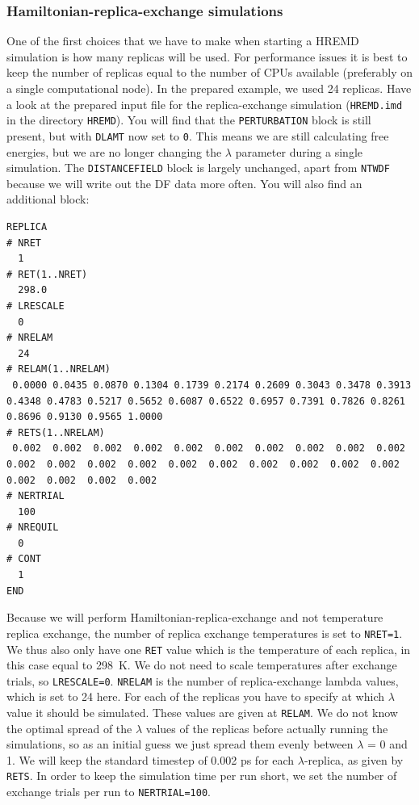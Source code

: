 \subsubsection{Hamiltonian-replica-exchange simulations}
One of the first choices that we have to make when starting a HREMD simulation is how many replicas will be used. 
For performance issues it is best to keep the number of replicas equal to the number of CPUs available (preferably on a single computational node). 
In the prepared example, we used 24 replicas. Have a look at the prepared input file for the replica-exchange simulation (\texttt{HREMD.imd} in the directory \texttt{HREMD}). 
You will find that the \texttt{PERTURBATION} block is still present, but with \texttt{DLAMT} now set to \texttt{0}. 
This means we are still calculating free energies, but we are no longer changing the $\lambda$ parameter during a single simulation. 
The \texttt{DISTANCEFIELD} block is largely unchanged, apart from \texttt{NTWDF} because we will write out the DF data more often. You will also find an additional block:
\begin{lstlisting}
REPLICA
# NRET
  1
# RET(1..NRET)
  298.0
# LRESCALE
  0
# NRELAM
  24
# RELAM(1..NRELAM)
 0.0000 0.0435 0.0870 0.1304 0.1739 0.2174 0.2609 0.3043 0.3478 0.3913 0.4348 0.4783 0.5217 0.5652 0.6087 0.6522 0.6957 0.7391 0.7826 0.8261 0.8696 0.9130 0.9565 1.0000
# RETS(1..NRELAM)
 0.002  0.002  0.002  0.002  0.002  0.002  0.002  0.002  0.002  0.002  0.002  0.002  0.002  0.002  0.002  0.002  0.002  0.002  0.002  0.002  0.002  0.002  0.002  0.002
# NERTRIAL
  100
# NREQUIL
  0
# CONT
  1
END
\end{lstlisting}
Because we will perform Hamiltonian-replica-exchange and not temperature replica exchange, the number of replica exchange temperatures is set to \texttt{NRET=1}. 
We thus also only have one \texttt{RET} value which is the temperature of each replica, in this case equal to 298~K. 
We do not need to scale temperatures after exchange trials, so \texttt{LRESCALE=0}. \texttt{NRELAM} is the number of replica-exchange lambda values, which is set to 24 here. 
For each of the replicas you have to specify at which $\lambda$ value it should be simulated. These values are given at \texttt{RELAM}. 
We do not know the optimal spread of the $\lambda$ values of the replicas before actually running the simulations, so as an initial guess we just spread them evenly between $\lambda$ = 0 and 1. 
We will keep the standard timestep of 0.002 ps for each $\lambda$-replica, as given by \texttt{RETS}. 
In order to keep the simulation time per run short, we set the number of exchange trials per run to \texttt{NERTRIAL=100}. 

